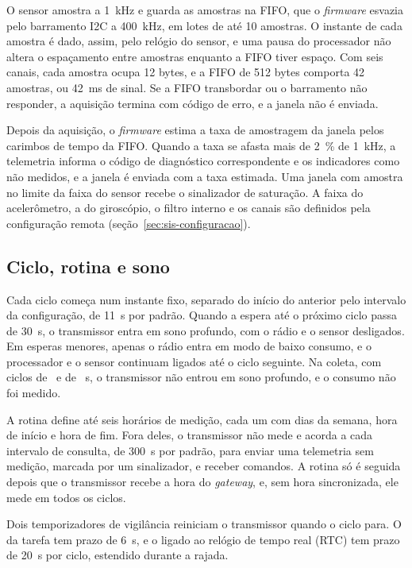 O sensor amostra a \SI{1}{\kilo\hertz} e guarda as amostras na FIFO, que o \textit{firmware} esvazia pelo barramento I2C a \SI{400}{\kilo\hertz}, em lotes de até \num{10} amostras. O instante de cada amostra é dado, assim, pelo relógio do sensor, e uma pausa do processador não altera o espaçamento entre amostras enquanto a FIFO tiver espaço. Com seis canais, cada amostra ocupa \num{12} bytes, e a FIFO de \num{512} bytes comporta \num{42} amostras, ou \SI{42}{\milli\second} de sinal. Se a FIFO transbordar ou o barramento não responder, a aquisição termina com código de erro, e a janela não é enviada.

Depois da aquisição, o \textit{firmware} estima a taxa de amostragem da janela pelos carimbos de tempo da FIFO. Quando a taxa se afasta mais de \SI{2}{\percent} de \SI{1}{\kilo\hertz}, a telemetria informa o código de diagnóstico correspondente e os indicadores como não medidos, e a janela é enviada com a taxa estimada. Uma janela com amostra no limite da faixa do sensor recebe o sinalizador de saturação. A faixa do acelerômetro, a do giroscópio, o filtro interno e os canais são definidos pela configuração remota (seção~\ref{sec:sis-configuracao}).

\subsection{Ciclo, rotina e sono}

Cada ciclo começa num instante fixo, separado do início do anterior pelo intervalo da configuração, de \SI{11}{\second} por padrão. Quando a espera até o próximo ciclo passa de \SI{30}{\second}, o transmissor entra em sono profundo, com o rádio e o sensor desligados. Em esperas menores, apenas o rádio entra em modo de baixo consumo, e o processador e o sensor continuam ligados até o ciclo seguinte. Na coleta, com ciclos de \campoCicloUm\ e de \campoCicloDois~s, o transmissor não entrou em sono profundo, e o consumo não foi medido.

A rotina define até seis horários de medição, cada um com dias da semana, hora de início e hora de fim. Fora deles, o transmissor não mede e acorda a cada intervalo de consulta, de \SI{300}{\second} por padrão, para enviar uma telemetria sem medição, marcada por um sinalizador, e receber comandos. A rotina só é seguida depois que o transmissor recebe a hora do \textit{gateway}, e, sem hora sincronizada, ele mede em todos os ciclos.

Dois temporizadores de vigilância reiniciam o transmissor quando o ciclo para. O da tarefa tem prazo de \SI{6}{\second}, e o ligado ao relógio de tempo real (RTC) tem prazo de \SI{20}{\second} por ciclo, estendido durante a rajada.

